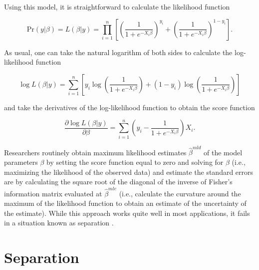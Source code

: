 \documentclass[12pt]{article}
\begin{document}
Using this model, it is straightforward to calculate the likelihood function 

\begin{equation}\nonumber
\text{Pr}(y | \beta) = L(\beta | y) = \displaystyle \prod_{i = 1}^n \left[\left( \dfrac{1}{1 + e^{-X_i\beta}}\right)^{y_i} + \left( \dfrac{1}{1 + e^{-X_i\beta}}\right)^{1 - y_i}\right]\text{.}
\end{equation}

\noindent As usual, one can take the natural logarithm of both sides to calculate the log-likelihood function 

\begin{equation}\nonumber
\log L(\beta | y) = \displaystyle \sum_{i = 1}^n \left[y_i \log \left( \dfrac{1}{1 + e^{-X_i\beta}}\right) + (1 - y_i) \log \left( \dfrac{1}{1 + e^{-X_i\beta}}\right)\right]
\end{equation}

\noindent and take the derivatives of the log-likelihood function to obtain the score function

\begin{equation}\nonumber
\dfrac{\partial \log L(\beta | y)}{\partial \beta} = \displaystyle \sum_{i = 1}^n\left(y_i - \dfrac{1}{1 + e^{-X_i\beta}}\right)X_i\text{.}
\end{equation}

Researchers routinely obtain maximum likelihood estimates $\hat{\beta}^{mld}$ of the model parameters $\beta$ by setting the score function equal to zero and solving for $\beta$ (i.e., maximizing the likelihood of the observed data) and estimate the standard errors are by calculating the square root of the diagonal of the inverse of Fisher's information matrix evaluated at $\hat{\beta}^{mle}$ (i.e., calculate the curvature around the maximum of the likelihood function to obtain an estimate of the uncertainty of the estimate). While this approach works quite well in most applications, it fails in a situation known as separation \citep{Zorn2005}.

\section*{Separation}
\end{document}
